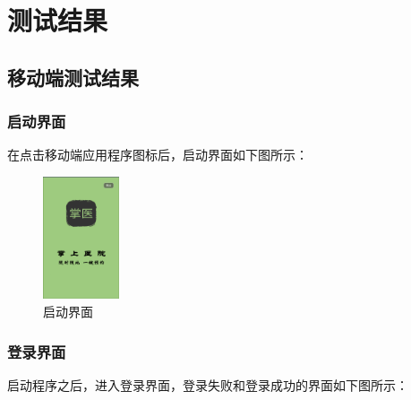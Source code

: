 \documentclass[UTF8,12pt]{article}
\begin{document}
\newpage

\section{测试结果}

\subsection{移动端测试结果}
\subsubsection{启动界面}
在点击移动端应用程序图标后，启动界面如下图所示：

\begin{figure}[htbp]
    \centering
    \includegraphics[width=0.2\textwidth]{imgs/10.png}
    \caption{启动界面}
\end{figure}

\subsubsection{登录界面}
启动程序之后，进入登录界面，登录失败和登录成功的界面如下图所示：
\end{document}
